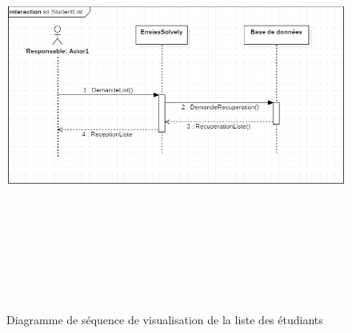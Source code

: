 \documentclass[11.5pt]{report}
\begin{document}
\begin{figure}[h]
	
	\begin{center}
		\includegraphics[width=400pt,height=400pt]{seq7.png} 
		\caption{Diagramme de séquence de visualisation de la liste des étudiants}
	\end{center}
	
\end{figure}
\newpage
\end{document}
